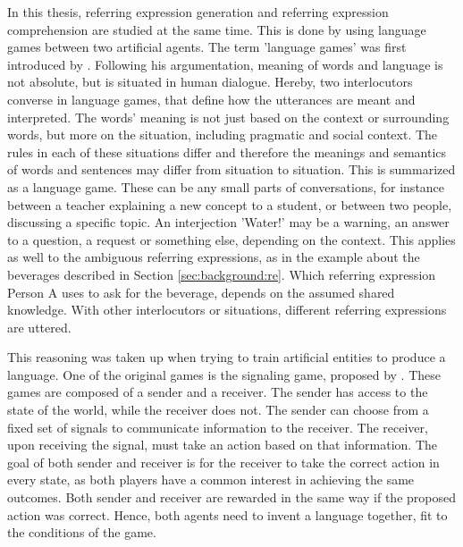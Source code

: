 In this thesis, referring expression generation and referring expression comprehension are studied at the same time.
This is done by using language games between two artificial agents.
The term 'language games' was first introduced by \citet{Wittgenstein1953}.
Following his argumentation, meaning of words and language is not absolute, but is situated in human dialogue.
Hereby, two interlocutors converse in language games, that define how the utterances are meant and interpreted.
The words' meaning is not just based on the context or surrounding words, but more on the situation, including pragmatic and social context.
The rules in each of these situations differ and therefore the meanings and semantics of words and sentences may differ from situation to situation.
This is summarized as a language game.
These can be any small parts of conversations, for instance between a teacher explaining a new concept to a student, or between two people, discussing a specific topic.
An interjection 'Water!' may be a warning, an answer to a question, a request or something else, depending on the context.
This applies as well to the ambiguous referring expressions, as in the example about the beverages described in Section \ref{sec:background:re}.
Which referring expression Person A uses to ask for the beverage, depends on the assumed shared knowledge.
With other interlocutors or situations, different referring expressions are uttered.

This reasoning was taken up when trying to train artificial entities to produce a language.
One of the original games is the signaling game, proposed by \citet{Lewis1969}.
These games are composed of a sender and a receiver.
The sender has access to the state of the world, while the receiver does not.
The sender can choose from a fixed set of signals to communicate information to the receiver.
The receiver, upon receiving the signal, must take an action based on that information.
The goal of both sender and receiver is for the receiver to take the correct action in every state, as both players have a common interest in achieving the same outcomes.
Both sender and receiver are rewarded in the same way if the proposed action was correct.
Hence, both agents need to invent a language together, fit to the conditions of the game.

